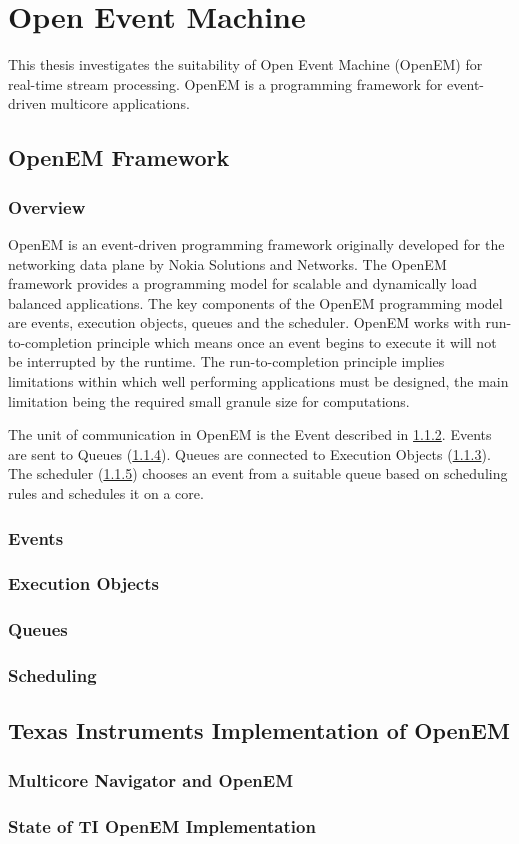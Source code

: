 \chapter{Open Event Machine}
\label{chapter:openem}
This thesis investigates the suitability of Open Event Machine (OpenEM) for
real-time stream processing. OpenEM is a programming framework for event-driven
multicore applications.

\section{OpenEM Framework}
\subsection{Overview}
OpenEM is an event-driven programming framework originally developed for the
networking data plane by Nokia Solutions and Networks. The OpenEM framework
provides a programming model for scalable and dynamically load balanced
applications. The key components of the OpenEM programming model are events,
execution objects, queues and the scheduler. OpenEM works with
run-to-completion principle which means once an event begins to execute it will
not be interrupted by the runtime. The run-to-completion principle implies
limitations within which well performing applications must be designed, the
main limitation being the required small granule size for computations.
\cite{openempage}

The unit of communication in OpenEM is the Event described in
\ref{subsec:event}. Events are sent to Queues (\ref{subsec:queues}). Queues are
connected to Execution Objects (\ref{subsec:eos}). The scheduler
(\ref{subsec:schedule}) chooses an event from a suitable queue based on
scheduling rules and schedules it on a core.
\subsection{Events}
\label{subsec:event}
\subsection{Execution Objects}
\label{subsec:eos}
\subsection{Queues}
\label{subsec:queues}
\subsection{Scheduling}
\label{subsec:schedule}

\section{Texas Instruments Implementation of OpenEM}
\subsection{Multicore Navigator and OpenEM}
\subsection{State of TI OpenEM Implementation}


